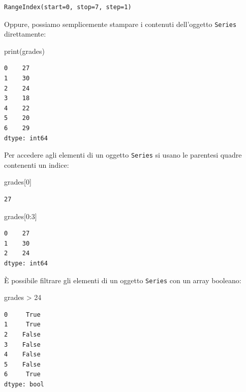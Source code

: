 \documentclass[
  letterpaper,
  krantz2]{{[}./krantz{]}}
\newenvironment{Shaded}{\begin{snugshade}}{\end{snugshade}}
\newcommand{\BuiltInTok}[1]{\textcolor[rgb]{0.00,0.23,0.31}{#1}}
\newcommand{\DecValTok}[1]{\textcolor[rgb]{0.68,0.00,0.00}{#1}}
\newcommand{\NormalTok}[1]{\textcolor[rgb]{0.00,0.23,0.31}{#1}}
\newcommand{\OperatorTok}[1]{\textcolor[rgb]{0.37,0.37,0.37}{#1}}
\begin{document}
\begin{verbatim}
RangeIndex(start=0, stop=7, step=1)
\end{verbatim}

Oppure, possiamo semplicemente stampare i contenuti dell'oggetto
\texttt{Series} direttamente:

\begin{Shaded}
\begin{Highlighting}[]
\BuiltInTok{print}\NormalTok{(grades)}
\end{Highlighting}
\end{Shaded}

\begin{verbatim}
0    27
1    30
2    24
3    18
4    22
5    20
6    29
dtype: int64
\end{verbatim}

Per accedere agli elementi di un oggetto \texttt{Series} si usano le
parentesi quadre contenenti un indice:

\begin{Shaded}
\begin{Highlighting}[]
\NormalTok{grades[}\DecValTok{0}\NormalTok{]}
\end{Highlighting}
\end{Shaded}

\begin{verbatim}
27
\end{verbatim}

\begin{Shaded}
\begin{Highlighting}[]
\NormalTok{grades[}\DecValTok{0}\NormalTok{:}\DecValTok{3}\NormalTok{]}
\end{Highlighting}
\end{Shaded}

\begin{verbatim}
0    27
1    30
2    24
dtype: int64
\end{verbatim}

È possibile filtrare gli elementi di un oggetto \texttt{Series} con un
array booleano:

\begin{Shaded}
\begin{Highlighting}[]
\NormalTok{grades }\OperatorTok{\textgreater{}} \DecValTok{24}
\end{Highlighting}
\end{Shaded}

\begin{verbatim}
0     True
1     True
2    False
3    False
4    False
5    False
6     True
dtype: bool
\end{verbatim}
\end{document}
